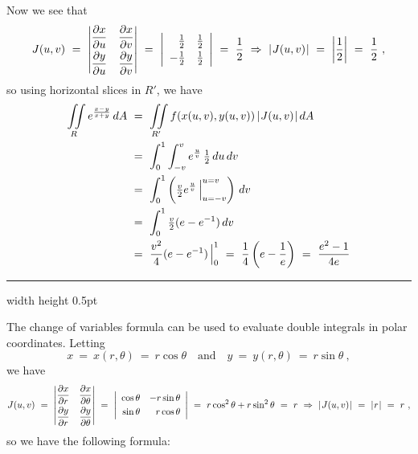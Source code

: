 \begin{exmp}
 Now we see that
 \begin{displaymath}
  J(u,v) ~=~
   \begin{vmatrix}
    \dfrac{\partial x}{\partial u} & \dfrac{\partial x}{\partial v}\smallskip\\
    \dfrac{\partial y}{\partial u} & \dfrac{\partial y}{\partial v}
   \end{vmatrix} ~=~
   \left| \begin{array}{rr}
    \tfrac{1}{2} & \tfrac{1}{2}\smallskip\\
    -\tfrac{1}{2} & \tfrac{1}{2}
   \end{array}\right| ~=~ \frac{1}{2} ~\Rightarrow~ \abs{J(u,v)} ~=~ \left| \frac{1}{2} \right| ~=~ \frac{1}{2} ~,
 \end{displaymath}
 so using horizontal slices in $R'$, we have
 \begin{align*}
  \iint\limits_{R} e^{\frac{x-y}{x+y}} \,dA ~&=~ \iint\limits_{R'} f(x(u,v),y(u,v))\,\lvert\mspace{1mu}J(u,v)\mspace{1mu}\rvert\,dA\\
  &=~ \int_0^1 \int_{-v}^v e^{\frac{u}{v}} \, \tfrac{1}{2}\,du\,dv\\
  &=~ \int_0^1 \left( \tfrac{v}{2} e^{\frac{u}{v}} \,\Big|_{u=-v}^{u=v} \right) \,dv\\
  &=~ \int_0^1 \tfrac{v}{2} (e - e^{-1})\,dv\\
  &=~ \frac{v^2}{4} (e - e^{-1}) \,\Big|_{0}^{1} ~=~ \frac{1}{4} \left( e - \frac{1}{e} \right) ~=~ \frac{e^2 - 1}{4e}
 \end{align*}
\end{exmp}
\hrule width \textwidth height 0.5pt

The change of variables formula can be used to evaluate double integrals in polar coordinates. Letting
\begin{displaymath}
 x ~=~ x(r,\theta) ~=~ r\cos \theta \quad \text{and} \quad y ~=~ y(r,\theta) ~=~ r\sin \theta ~,
\end{displaymath}
we have
\begin{displaymath}
 J(u,v) ~=~
  \begin{vmatrix}
   \dfrac{\partial x}{\partial r} & \dfrac{\partial x}{\partial \theta}\smallskip\\
   \dfrac{\partial y}{\partial r} & \dfrac{\partial y}{\partial \theta}
  \end{vmatrix} ~=~
  \left| \begin{array}{rr}
   \cos \theta & -r\sin \theta\smallskip\\
   \sin \theta & r\cos \theta
  \end{array}\right| ~=~ r\cos^2 \theta + r\sin^2 \theta ~=~ r ~\Rightarrow~ \abs{J(u,v)} ~=~ \abs{r} ~=~ r ~,
\end{displaymath}
so we have the following formula:

